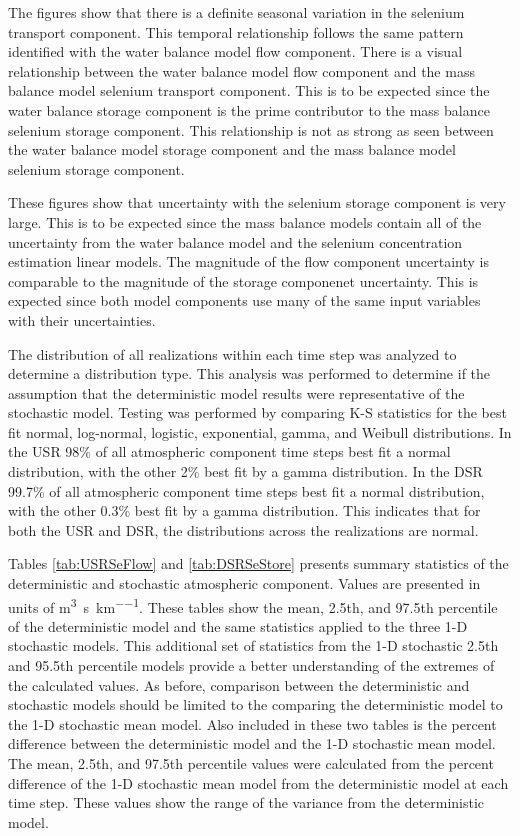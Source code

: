 \begin{linenumbers}
The figures show that there is a definite seasonal variation in the selenium transport component.  This temporal relationship follows the same pattern identified with the water balance model flow component.  There is a visual relationship between the water balance model flow component and the mass balance model selenium transport component.  This is to be expected since the water balance storage component is the prime contributor to the mass balance selenium storage component.  This relationship is not as strong as seen between the water balance model storage component and the mass balance model selenium storage component.

These figures show that uncertainty with the selenium storage component is very large.  This is to be expected since the mass balance models contain all of the uncertainty from the water balance model and the selenium concentration estimation linear models.  The magnitude of the flow component uncertainty is comparable to the magnitude of the storage componenet uncertainty.  This is expected since both model components use many of the same input variables with their uncertainties.

The distribution of all realizations within each time step was analyzed to determine a distribution type.  This analysis was performed to determine if the assumption that the deterministic model results were representative of the stochastic model.  Testing was performed by comparing K-S statistics for the best fit normal, log-normal, logistic, exponential, gamma, and Weibull distributions.  In the USR 98\% of all atmospheric component time steps best fit a normal distribution, with the other 2\% best fit by a gamma distribution.  In the DSR 99.7\% of all atmospheric component time steps best fit a normal distribution, with the other 0.3\% best fit by a gamma distribution.  This indicates that for both the USR and DSR, the distributions across the realizations are normal. 

Tables \ref{tab:USRSeFlow} and \ref{tab:DSRSeStore} presents summary statistics of the deterministic and stochastic atmospheric component.  Values are presented in units of \si{\cubic\meter\per\second\per\kilo\meter}.   These tables show the mean, 2.5th, and 97.5th percentile of the deterministic model and the same statistics applied to the three 1-D stochastic models.  This additional set of statistics from the 1-D stochastic 2.5th and 95.5th percentile models provide a better understanding of the extremes of the calculated values.  As before, comparison between the deterministic and stochastic models should be limited to the comparing the deterministic model to the 1-D stochastic mean model.  Also included in these two tables is the percent difference between the deterministic model and the 1-D stochastic mean model.  The mean, 2.5th, and 97.5th percentile values were calculated from the percent difference of the 1-D stochastic mean model from the deterministic model at each time step.  These values show the range of the variance from the deterministic model.


\end{linenumbers}
